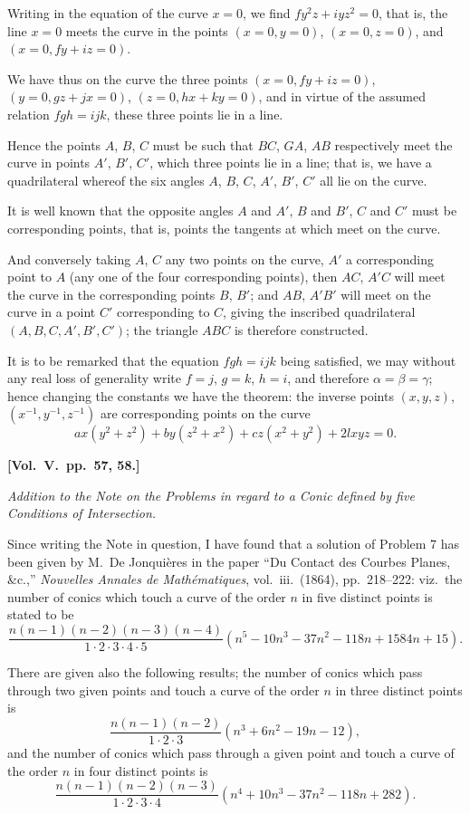 \documentclass[11pt,a4paper]{article}
\theoremstyle{plain}
\theoremstyle{definition}
\theoremstyle{remark}
\begin{document}
Writing in the equation of the curve $x=0$, we find $fy^{2}z+iyz^{2}=0$, that is, the line $x=0$ meets the curve in the points $(x=0,y=0)$, $(x=0,z=0)$, and $(x=0,fy+iz=0)$.

We have thus on the curve the three points $(x=0,fy+iz=0)$, $(y=0,gz+jx=0)$, $(z=0,hx+ky=0)$, and in virtue of the assumed relation $fgh=ijk$, these three points lie in a line.

Hence the points $A$, $B$, $C$ must be such that $BC$, $GA$, $AB$ respectively meet the curve in points $A'$, $B'$, $C'$, which three points lie in a line; that is, we have a quadrilateral whereof the six angles $A$, $B$, $C$, $A'$, $B'$, $C'$ all lie on the curve.

It is well known that the opposite angles $A$ and $A'$, $B$ and $B'$, $C$ and $C'$ must be corresponding points, that is, points the tangents at which meet on the curve.

And conversely taking $A$, $C$ any two points on the curve, $A'$ a corresponding point to $A$ (any one of the four corresponding points), then $AC$, $A'C$ will meet the curve in the corresponding points $B$, $B'$; and $AB$, $A'B'$ will meet on the curve in a point $C'$ corresponding to $C$, giving the inscribed quadrilateral $(A,B,C,A',B',C')$; the triangle $ABC$ is therefore constructed.

It is to be remarked that the equation $fgh=ijk$ being satisfied, we may without any real loss of generality write $f=j$, $g=k$, $h=i$, and therefore $\alpha=\beta=\gamma$; hence changing the constants we have the theorem: the inverse points $(x,y,z)$, $(x^{-1},y^{-1},z^{-1})$ are corresponding points on the curve
\[
ax(y^{2}+z^{2})+by(z^{2}+x^{2})+cz(x^{2}+y^{2})+2lxyz=0.
\]


\textbf{[Vol.\ V.\ pp.\ 57, 58.]}

\textit{Addition to the Note on the Problems in regard to a Conic defined by five Conditions of Intersection.}

Since writing the Note in question, I have found that a solution of Problem 7 has been given by M.\ De Jonqui\`eres in the paper ``Du Contact des Courbes Planes, \&c.,'' \textit{Nouvelles Annales de Math\'ematiques}, vol.\ iii.\ (1864), pp.\ 218--222: viz.\ the number of conics which touch a curve of the order $n$ in five distinct points is stated to be
\[
\frac{n(n-1)(n-2)(n-3)(n-4)}{1\cdot2\cdot3\cdot4\cdot5}(n^{5}-10n^{3}-37n^{2}-118n+1584n+15).
\]

There are given also the following results; the number of conics which pass through two given points and touch a curve of the order $n$ in three distinct points is
\[
\frac{n(n-1)(n-2)}{1\cdot2\cdot3}(n^{3}+6n^{2}-19n-12),
\]
and the number of conics which pass through a given point and touch a curve of the order $n$ in four distinct points is
\[
\frac{n(n-1)(n-2)(n-3)}{1\cdot2\cdot3\cdot4}(n^{4}+10n^{3}-37n^{2}-118n+282).
\]
\end{document}
